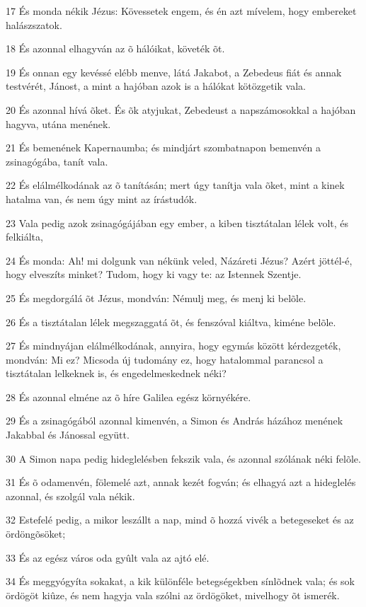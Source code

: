 \par 17 És monda nékik Jézus: Kövessetek engem, és én azt mívelem, hogy embereket halászszatok.
\par 18 És azonnal elhagyván az õ hálóikat, követék õt.
\par 19 És onnan egy kevéssé elébb menve, látá Jakabot, a Zebedeus fiát és annak testvérét, Jánost, a mint a hajóban azok is a hálókat kötözgetik vala.
\par 20 És azonnal hívá õket. És õk atyjukat, Zebedeust a napszámosokkal a hajóban hagyva, utána menének.
\par 21 És bemenének Kapernaumba; és mindjárt szombatnapon bemenvén a zsinagógába, tanít vala.
\par 22 És elálmélkodának az õ tanításán; mert úgy tanítja vala õket, mint a kinek hatalma van, és nem úgy mint az írástudók.
\par 23 Vala pedig azok zsinagógájában egy ember, a kiben tisztátalan lélek volt, és felkiálta,
\par 24 És monda: Ah! mi dolgunk van nékünk veled, Názáreti Jézus? Azért jöttél-é, hogy elveszíts minket? Tudom, hogy ki vagy te:  az Istennek Szentje.
\par 25 És megdorgálá õt Jézus, mondván: Némulj meg, és menj ki belõle.
\par 26 És a tisztátalan lélek megszaggatá õt, és fenszóval kiáltva, kiméne belõle.
\par 27 És mindnyájan elálmélkodának, annyira, hogy egymás között kérdezgeték, mondván: Mi ez? Micsoda új tudomány ez, hogy hatalommal parancsol a tisztátalan lelkeknek is, és engedelmeskednek néki?
\par 28 És azonnal elméne az õ híre Galilea egész környékére.
\par 29 És a zsinagógából azonnal kimenvén, a Simon és András házához menének Jakabbal és Jánossal együtt.
\par 30 A Simon napa pedig hideglelésben fekszik vala, és azonnal szólának néki felõle.
\par 31 És õ odamenvén, fölemelé azt, annak kezét fogván; és elhagyá azt a hideglelés azonnal, és szolgál vala nékik.
\par 32 Estefelé pedig, a mikor leszállt a nap, mind õ hozzá vivék a betegeseket és az ördöngõsöket;
\par 33 És az egész város oda gyûlt vala az ajtó elé.
\par 34 És meggyógyíta sokakat, a kik különféle betegségekben sínlõdnek vala; és sok ördögöt kiûze, és nem hagyja vala szólni az ördögöket, mivelhogy õt ismerék.
